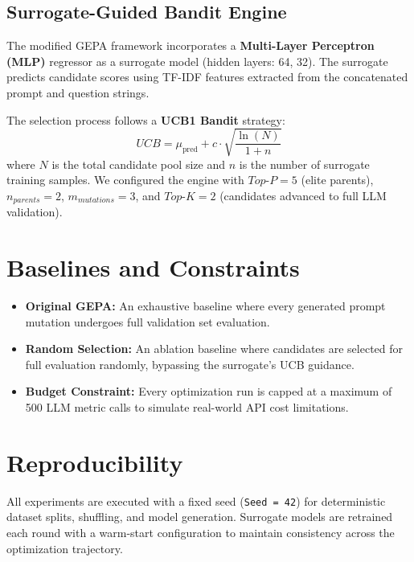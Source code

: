 \subsection{Surrogate-Guided Bandit Engine}
The modified GEPA framework incorporates a \textbf{Multi-Layer Perceptron (MLP)} regressor as a surrogate model (hidden layers: 64, 32). The surrogate predicts candidate scores using TF-IDF features extracted from the concatenated prompt and question strings. 

The selection process follows a \textbf{UCB1 Bandit} strategy:
\[ UCB = \mu_{\text{pred}} + c \cdot \sqrt{\frac{\ln(N)}{1 + n}} \]
where $N$ is the total candidate pool size and $n$ is the number of surrogate training samples. We configured the engine with $Top\text{-}P=5$ (elite parents), $n_{parents}=2$, $m_{mutations}=3$, and $Top\text{-}K=2$ (candidates advanced to full LLM validation).

\section{Baselines and Constraints}

\begin{itemize}
    \item \textbf{Original GEPA:} An exhaustive baseline where every generated prompt mutation undergoes full validation set evaluation.
    \item \textbf{Random Selection:} An ablation baseline where candidates are selected for full evaluation randomly, bypassing the surrogate's UCB guidance.
    \item \textbf{Budget Constraint:} Every optimization run is capped at a maximum of 500 LLM metric calls to simulate real-world API cost limitations.
\end{itemize}

\section{Reproducibility}
All experiments are executed with a fixed seed (\texttt{Seed = 42}) for deterministic dataset splits, shuffling, and model generation. Surrogate models are retrained each round with a warm-start configuration to maintain consistency across the optimization trajectory.
